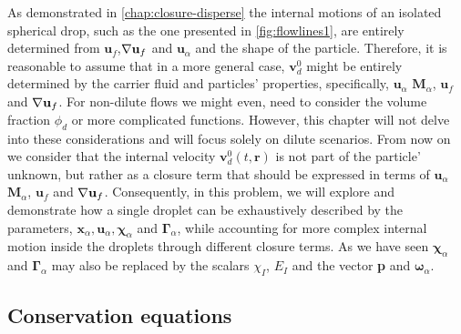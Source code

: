 As demonstrated in \ref{chap:closure-disperse} the internal motions of an isolated spherical drop, such as the one presented in  \ref{fig:flowlines1}, are entirely determined  from $\textbf{u}_f$,$\mathbf{\nabla}\textbf{u}_f$ and $\textbf{u}_\alpha$ and the shape of the particle. 
Therefore, it is reasonable to assume that in a more general case, $\textbf{v}_d^0$ might be entirely determined by the carrier fluid and particles' properties, specifically, $\textbf{u}_\alpha$ $\textbf{M}_\alpha$, $\textbf{u}_f$ and $\mathbf{\nabla}\textbf{u}_f$. 
For non-dilute flows we might even, need to consider the volume fraction $\phi_d$ or more complicated functions.
However, this chapter will not delve into these considerations and will focus solely on dilute scenarios.
From now on we consider that the internal velocity $\textbf{v}^0_d(t,\textbf{r})$ is not part of the particle' unknown, but rather as a closure term that should be expressed in terms of $\textbf{u}_\alpha$ $\textbf{M}_\alpha$, $\textbf{u}_f$ and $\mathbf{\nabla}\textbf{u}_f$. 
Consequently, in this problem, we will explore and demonstrate how a single droplet can be exhaustively described by the parameters, $\textbf{x}_\alpha, \textbf{u}_\alpha, \bm\chi_\alpha$ and $\bm\Gamma_\alpha$, while accounting for more complex internal motion inside the droplets through different closure terms.
As we have seen $\bm\chi_\alpha$ and $\bm\Gamma_\alpha$ may also be replaced by the scalars $\chi_I$, $E_I$ and the vector \textbf{p} and $\bm\omega_\alpha$. 

\subsection{Conservation equations}

